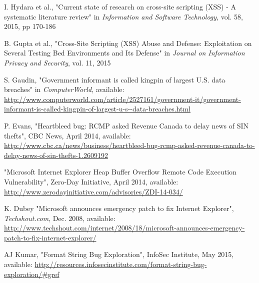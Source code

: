\documentclass[11pt,journal]{article}
\begin{document}
\begin{thebibliography}{1}
	
	I. Hydara et al., "Current state of research on cross-site scripting (XSS) - A systematic literature review" in \emph{Information and Software Technology}, vol. 58, 2015, pp 170-186
	
	B. Gupta et al., "Cross-Site Scripting (XSS) Abuse and Defense: Exploitation on Several Testing Bed Environments and Its Defense" in \emph{Journal on Information Privacy and Security}, vol. 11, 2015
	
	S. Gaudin, "Government informant is called kingpin of largest U.S. data breaches" in \emph{ComputerWorld}, available:\\ \url{http://www.computerworld.com/article/2527161/government-it/government-informant-is-called-kingpin-of-largest-u-s--data-breaches.html}
	
	P. Evans, "Heartbleed bug: RCMP asked Revenue Canada to delay news of SIN thefts", CBC News, April 2014, available: \url{http://www.cbc.ca/news/business/heartbleed-bug-rcmp-asked-revenue-canada-to-delay-news-of-sin-thefts-1.2609192}
	
	"Microsoft Internet Explorer Heap Buffer Overflow Remote Code Execution Vulnerability", Zero-Day Initiative, April 2014, available: \url{http://www.zerodayinitiative.com/advisories/ZDI-14-034/}
	
	K. Dubey "Microsoft announces emergency patch to fix Internet Explorer", \emph{Techshout.com}, Dec. 2008, available: \url{http://www.techshout.com/internet/2008/18/microsoft-announces-emergency-patch-to-fix-internet-explorer/}
	
	AJ Kumar, "Format String Bug Exploration", InfoSec Institute, May 2015, available: \url{http://resources.infosecinstitute.com/format-string-bug-exploration/#gref}
\end{thebibliography}
	
\end{document}
